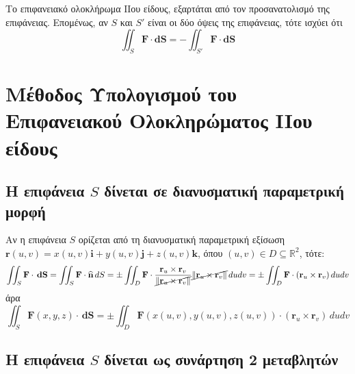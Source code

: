 \begin{rem}
  Το επιφανειακό ολοκλήρωμα ΙΙου είδους, εξαρτάται από τον προσανατολισμό της επιφάνειας.
  Επομένως, αν $S$ και $ S' $ είναι οι δύο όψεις της επιφάνειας, τότε ισχύει ότι 
  \[
    \iint_{S} \mathbf{F} \cdot {\mathbf{dS}} = - \iint_{S'} \mathbf{F} \cdot
    {\mathbf{dS}} 
  \] 
\end{rem}



\section{Μέθοδος Υπολογισμού του Επιφανειακού Ολοκληρώματος IIου είδους}

\subsection*{Η επιφάνεια $S$ δίνεται σε διανυσματική παραμετρική μορφή}

Αν η επιφάνεια $S$ ορίζεται από τη διανυσματική παραμετρική εξίσωση 
$ \mathbf{r}(u,v) = x(u,v)\mathbf{i}+y(u,v)\mathbf{j}+z(u,v)\mathbf{k} $, όπου 
$ (u,v) \in D \subseteq \mathbb{R}^{2} $, τότε:
\[
  \iint_{S} \mathbf{F} \cdot \,{\mathbf{dS}} = \iint_{S} \mathbf{F} \cdot
  \mathbf{\widehat{n}}\,{dS} = \pm\iint_{D} \mathbf{F} \cdot \frac{\mathbf{r}_{u} \times
  \mathbf{r}_{v}}{\cancel{\norm{\mathbf{r}_{u} \times \mathbf{r}_{v}}}}
  \cancel{\norm{\mathbf{r}_{u} \times \mathbf{r}_{v}}}\,{du}{dv} = \pm\iint_{D} 
  \mathbf{F} \cdot (\mathbf{r}_{u} \times \mathbf{r}_{v}) \,{du}{dv}
\]
άρα
\begin{equation*}
  \boxed{\iint_{S} \mathbf{F}(x,y,z) \cdot \,{\mathbf{dS}} = \pm\iint_{D} 
    \mathbf{F}(x(u,v),y(u,v),z(u,v)) \cdot (\mathbf{r}_{u} \times \mathbf{r}_{v}) 
  \,{du}{dv}}
\end{equation*}

\subsection*{Η επιφάνεια $S$ δίνεται ως συνάρτηση 2 μεταβλητών}

